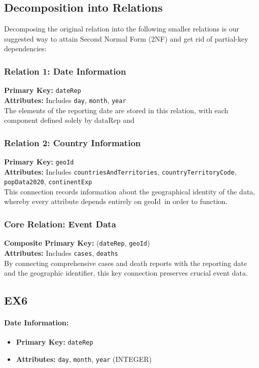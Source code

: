 \documentclass[10pt]{article}
\begin{document}
\subsection*{Decomposition into Relations}
Decomposing the original relation into the following smaller relations is our suggested way to attain Second Normal Form (2NF) and get rid of partial-key dependencies:

\subsubsection*{Relation 1: Date Information}
\textbf{Primary Key:} \texttt{dateRep} \\
\textbf{Attributes:} Includes \texttt{day}, \texttt{month}, \texttt{year} \\
The elements of the reporting date are stored in this relation, with each component defined solely by dataRep and

\subsubsection*{Relation 2: Country Information}
\textbf{Primary Key:} \texttt{geoId} \\
\textbf{Attributes:} Includes \texttt{countriesAndTerritories}, \texttt{countryTerritoryCode}, \texttt{popData2020}, \texttt{continentExp} \\
This connection records information about the geographical identity of the data, whereby every attribute depends entirely on geoId in order to function.

\subsubsection*{Core Relation: Event Data}
\textbf{Composite Primary Key:} (\texttt{dateRep}, \texttt{geoId}) \\
\textbf{Attributes:} Includes \texttt{cases}, \texttt{deaths} \\
By connecting comprehensive cases and death reports with the reporting date and the geographic identifier, this key connection preserves crucial event data.

\subsection{EX6}


\paragraph{Date Information:}
\begin{itemize}
    \item \textbf{Primary Key:} \texttt{dateRep}
    \item \textbf{Attributes:} \texttt{day}, \texttt{month}, \texttt{year} (INTEGER)
\end{itemize}
\end{document}
